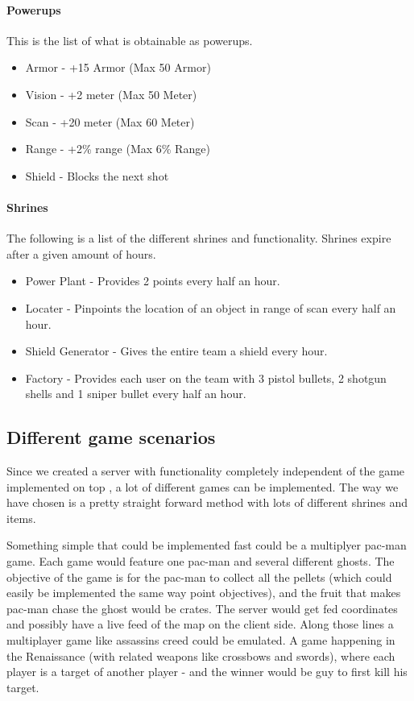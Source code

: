 \paragraph{Powerups}
This is the list of what is obtainable as powerups.
\begin{itemize}
\item Armor - +15 Armor (Max 50 Armor)
\item Vision - +2 meter (Max 50 Meter)
\item Scan - +20 meter (Max 60 Meter)
\item Range - +2\% range (Max 6\% Range)
\item Shield - Blocks the next shot
\end{itemize}

\paragraph{Shrines}
The following is a list of the different shrines and functionality. Shrines expire after a given amount of hours.
\begin{itemize}
\item Power Plant - Provides 2 points every half an hour.
\item Locater - Pinpoints the location of an object in range of scan every half an hour.
\item Shield Generator - Gives the entire team a shield every hour.
\item Factory - Provides each user on the team with 3 pistol bullets, 2 shotgun shells and 1 sniper bullet every half an hour.
\end{itemize}

\subsection{Different game scenarios}\label{subsec:game-scenarios}
Since we created a server with functionality completely independent of the game implemented on top , a lot of different games can be implemented. The way we have chosen is a pretty straight forward method with lots of different shrines and items.

Something simple that could be implemented fast could be a multiplyer pac-man game. Each game would feature one pac-man and several different ghosts. The objective of the game is for the pac-man to collect all the pellets (which could easily be implemented the same way point objectives), and the fruit that makes pac-man chase the ghost would be crates. The server would get fed coordinates and possibly have a live feed of the map on the client side.
Along those lines a multiplayer game like assassins creed could be emulated. A game happening in the Renaissance (with related weapons like crossbows and swords), where each player is a target of another player - and the winner would be guy to first kill his target.

